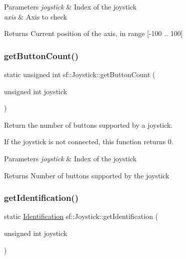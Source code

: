 \begin{DoxyParams}{Parameters}
{\em joystick} & Index of the joystick \\
\hline
{\em axis} & Axis to check\\
\hline
\end{DoxyParams}
\begin{DoxyReturn}{Returns}
Current position of the axis, in range \mbox{[}-\/100 .. 100\mbox{]} 
\end{DoxyReturn}
\mbox{\label{classsf_1_1_joystick_a4de9f445c6582bfe9f0873f695682885}} 
\subsubsection{\texorpdfstring{get\+Button\+Count()}{getButtonCount()}}
{\footnotesize\ttfamily static unsigned int sf\+::\+Joystick\+::get\+Button\+Count (\begin{DoxyParamCaption}\item[{unsigned int}]{joystick }\end{DoxyParamCaption})\hspace{0.3cm}{\ttfamily [static]}}



Return the number of buttons supported by a joystick. 

If the joystick is not connected, this function returns 0.


\begin{DoxyParams}{Parameters}
{\em joystick} & Index of the joystick\\
\hline
\end{DoxyParams}
\begin{DoxyReturn}{Returns}
Number of buttons supported by the joystick 
\end{DoxyReturn}
\mbox{\label{classsf_1_1_joystick_aa917c9435330e6e0368d3893672d1b74}} 
\subsubsection{\texorpdfstring{get\+Identification()}{getIdentification()}}
{\footnotesize\ttfamily static \hyperlink{structsf_1_1_joystick_1_1_identification}{Identification} sf\+::\+Joystick\+::get\+Identification (\begin{DoxyParamCaption}\item[{unsigned int}]{joystick }\end{DoxyParamCaption})\hspace{0.3cm}{\ttfamily [static]}}



